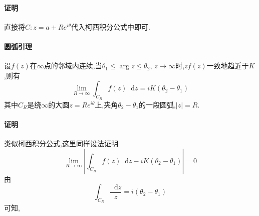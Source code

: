 \documentclass[UTF8]{ctexart}
\newcommand{\dif}{\mathop{}\!\mathrm{d}}
\begin{document}
\paragraph{证明}
直接将\(C:z=a+Re^{i\theta}\)代入柯西积分公式中即可.

\paragraph{圆弧引理}
设\(f(z)\)在\(\infty\)点的邻域内连续,当\(\theta_{1}\leqslant\arg z\leqslant\theta_{2}\),
\(z\rightarrow\infty\)时,\(zf(z)\)一致地趋近于\(K\),则有
\begin{equation}
  \lim_{R \to \infty}\int_{C_{R}}^{}f(z)\dif z=iK(\theta_{2}-\theta_{1})
\end{equation}
其中\(C_{R}\)是绕\(\infty\)的大圆\(z=Re^{i\theta}\)上,夹角\(\theta_{2}-\theta_{1}\)的一段圆弧,\(\left| z \right| =R\).

\paragraph{证明}
类似柯西积分公式,这里同样设法证明
\begin{equation}
  \lim_{R \to \infty} \left|\int_{C_R}^{}f(z)\dif z-iK(\theta_{2}-\theta_{1}) \right|=0
\end{equation}
由
\begin{equation}
  \int_{C_{R}}^{}\frac{\dif z}{z}=i(\theta_{2}-\theta_{1})
\end{equation}
可知,
\end{document}
